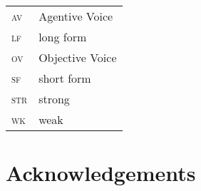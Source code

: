 \documentclass[output=paper
                ,modfonts
                ,nonflat
	        ,collection
	        ,collectionchapter
	        ,collectiontoclongg
 	        ,biblatex
                ,babelshorthands
                ,newtxmath
                ,draftmode
                ,colorlinks, citecolor=brown
]{./langsci/langscibook}
\begin{document}
\begin{tabularx}{.45\textwidth}{lX}
\textsc{av} & Agentive Voice\\
\textsc{lf} & long form\\ 
\textsc{ov} & Objective Voice\\
\textsc{sf} & short form\\
\textsc{str} & strong\\
\textsc{wk} & weak\\

\end{tabularx}

\section*{Acknowledgements}

{\sloppy
\printbibliography[heading=subbibliography,notkeyword=this] 
}
\end{document}
